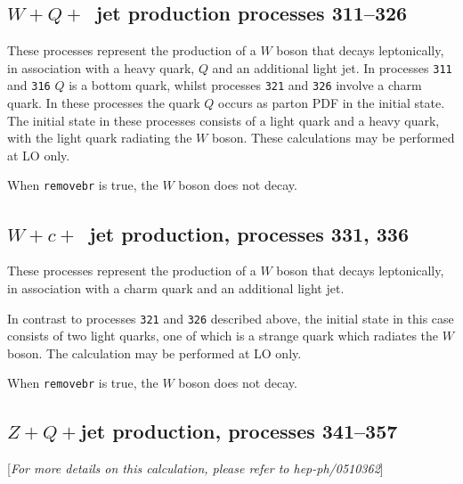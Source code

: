 \documentclass[12pt]{article}
\begin{document}

\subsection{$W+Q+$~jet production processes 311--326}
\label{subsec:wQj}

These processes represent the production of a $W$
boson that decays leptonically,
in association with a heavy quark, $Q$ and an additional light jet. In
processes {\tt 311} and {\tt 316} $Q$ is a bottom quark, whilst
processes {\tt 321} and {\tt 326} involve a charm quark.
In these processes the quark $Q$ occurs as parton PDF in the initial state. 
The initial state in these processes consists of a light quark and a heavy 
quark, with the light quark radiating the $W$ boson. These calculations may
be performed at LO only.

When {\tt removebr} is true, the $W$ boson does not decay.

\subsection{$W+c+$~jet production, processes 331, 336}
\label{subsec:wcj}

These processes represent the production of a $W$
boson that decays leptonically,
in association with a charm quark and an additional light jet. 

In contrast to processes {\tt 321} and {\tt 326} described above, the initial
state in this case consists of two light quarks, one of which is a
strange quark which radiates the $W$ boson. The calculation may
be performed at LO only.

When {\tt removebr} is true, the $W$ boson does not decay.

\subsection{$Z+Q+$jet production, processes 341--357}
\label{subsec:ZQj}

\begin{center}
[{\it For more details on this calculation, please refer to hep-ph/0510362}]
\end{center}
\end{document}

